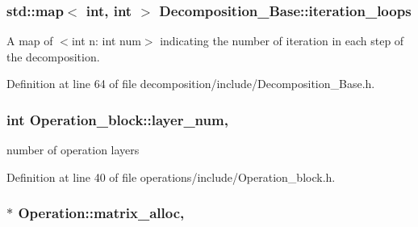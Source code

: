 \subsubsection[{\texorpdfstring{iteration\+\_\+loops}{iteration_loops}}]{\setlength{\rightskip}{0pt plus 5cm}std\+::map$<$ int, int $>$ Decomposition\+\_\+\+Base\+::iteration\+\_\+loops\hspace{0.3cm}{\ttfamily [protected]}}\hypertarget{class_decomposition___base_aa6f08845d47e18b6e6739b46d8fe35eb}{}\label{class_decomposition___base_aa6f08845d47e18b6e6739b46d8fe35eb}


A map of $<$int n\+: int num$>$ indicating the number of iteration in each step of the decomposition. 



Definition at line 64 of file decomposition/include/\+Decomposition\+\_\+\+Base.\+h.

\subsubsection[{\texorpdfstring{layer\+\_\+num}{layer_num}}]{\setlength{\rightskip}{0pt plus 5cm}int Operation\+\_\+block\+::layer\+\_\+num\hspace{0.3cm}{\ttfamily [protected]}, {\ttfamily [inherited]}}\hypertarget{class_operation__block_a907101b9a80e6ebeaa96cc7b973cf413}{}\label{class_operation__block_a907101b9a80e6ebeaa96cc7b973cf413}


number of operation layers 



Definition at line 40 of file operations/include/\+Operation\+\_\+block.\+h.

\subsubsection[{\texorpdfstring{matrix\+\_\+alloc}{matrix_alloc}}]{ $\ast$ Operation\+::matrix\+\_\+alloc\hspace{0.3cm}{\ttfamily [protected]}, {\ttfamily [inherited]}}\hypertarget{class_operation_ade4d28d271ca13950d04363aac1c382e}{}\label{class_operation_ade4d28d271ca13950d04363aac1c382e}



